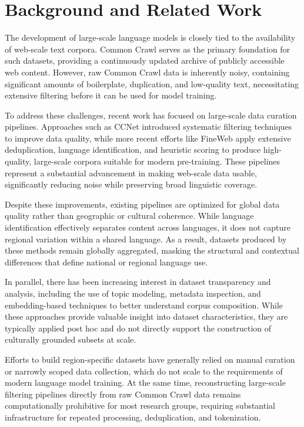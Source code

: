 \documentclass[11pt, a4paper]{article}
\begin{document}
\section{Background and Related Work}

The development of large-scale language models is closely tied to the availability of web-scale text corpora. Common Crawl serves as the primary foundation for such datasets, providing a continuously updated archive of publicly accessible web content. However, raw Common Crawl data is inherently noisy, containing significant amounts of boilerplate, duplication, and low-quality text, necessitating extensive filtering before it can be used for model training.

To address these challenges, recent work has focused on large-scale data curation pipelines. Approaches such as CCNet introduced systematic filtering techniques to improve data quality, while more recent efforts like FineWeb apply extensive deduplication, language identification, and heuristic scoring to produce high-quality, large-scale corpora suitable for modern pre-training. These pipelines represent a substantial advancement in making web-scale data usable, significantly reducing noise while preserving broad linguistic coverage.

Despite these improvements, existing pipelines are optimized for global data quality rather than geographic or cultural coherence. While language identification effectively separates content across languages, it does not capture regional variation within a shared language. As a result, datasets produced by these methods remain globally aggregated, masking the structural and contextual differences that define national or regional language use.

In parallel, there has been increasing interest in dataset transparency and analysis, including the use of topic modeling, metadata inspection, and embedding-based techniques to better understand corpus composition. While these approaches provide valuable insight into dataset characteristics, they are typically applied post hoc and do not directly support the construction of culturally grounded subsets at scale.

Efforts to build region-specific datasets have generally relied on manual curation or narrowly scoped data collection, which do not scale to the requirements of modern language model training. At the same time, reconstructing large-scale filtering pipelines directly from raw Common Crawl data remains computationally prohibitive for most research groups, requiring substantial infrastructure for repeated processing, deduplication, and tokenization.
\end{document}
